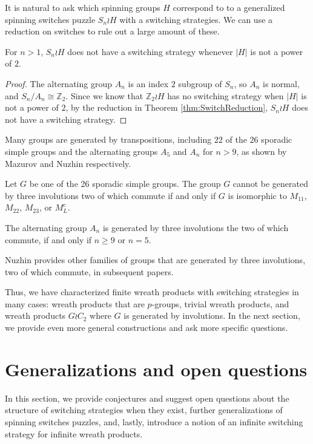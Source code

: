 It is natural to ask which
spinning groups $H$ correspond to to a generalized spinning switches puzzle
$S_n \wr H$ with a switching strategies.
We can use a reduction on switches to rule out a large amount of these.
\begin{proposition}
  For $n > 1$, $S_n \wr H$ does not have a switching strategy whenever
  $|H|$ is not a power of $2$.
\end{proposition}
\begin{proof}
  The alternating group $A_n$ is an index $2$ subgroup of $S_n$, so $A_n$ is
  normal, and $S_n/A_n \cong \mathbb Z_2$.
  Since we know that $\mathbb Z_2 \wr H$ has no switching strategy when
  $|H|$ is not a power of $2$,
  by the reduction in Theorem \ref{thm:SwitchReduction}, $S_n \wr H$ does
  not have a switching strategy.
\end{proof}

Many groups are generated by transpositions, including $22$ of the $26$
sporadic simple groups and the alternating groups $A_5$ and $A_n$ for $n > 9$,
as shown by Mazurov and Nuzhin respectively.
\begin{theorem}\cite{Mazurov2003}
  Let $G$ be one of the 26 sporadic simple groups.
  The group $G$ cannot be generated by three involutions two of which commute
  if and only if $G$ is isomorphic to $M_{11}$, $M_{22}$, $M_{23}$, or $M^c_L$.
\end{theorem}
\begin{theorem}\cite{Nuzhin1992}
  The alternating group $A_n$ is generated by three involutions the
  two of which commute, if and only if $n \geq 9$ or $n = 5$.
\end{theorem}

Nuzhin provides other families of groups that are generated by three
involutions, two of which commute, in subsequent papers.
\cite{Nuzhin0,Nuzhin1,Nuzhin2}

Thus, we have characterized finite wreath products with switching strategies
in many cases:
wreath products that are $p$-groups,
trivial wreath products, and
wreath products $G \wr C_2$ where $G$ is generated by involutions.
In the next section, we provide even more general constructions and ask
more specific questions.

%
%
\section{Generalizations and open questions}
\label{sec:OpenQuestions}
In this section, we provide conjectures and suggest open questions about
the structure of switching strategies when they exist,
further generalizations of spinning switches puzzles,
and, lastly, introduce a notion of an infinite switching strategy for infinite
wreath products.

